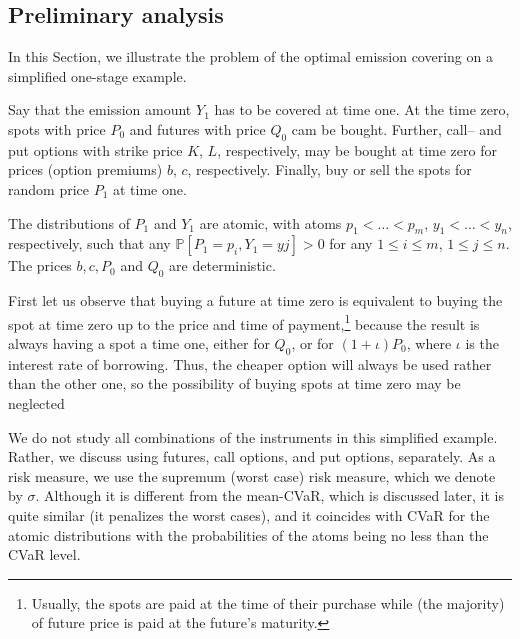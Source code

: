 \documentclass[3p,times]{elsarticle}
\begin{document}
\subsection*{Preliminary analysis}

In this Section, we illustrate the problem of the optimal emission covering on a simplified one-stage example. 

Say that the emission amount $Y_1$ has to be covered at time one. At the time zero, spots with price $P_0$ and futures with price $Q_0$ cam be bought.  Further, call-- and put options with strike price $K$, $L$, respectively, may be bought at time zero for prices (option premiums) $b$, $c$, respectively. Finally, buy or sell the spots for random price $P_1$ at time one.

The distributions of $P_1$ and $Y_1$ are atomic, with atoms $p_1<\dots<p_m$, $y_1< \dots < y_n$, respectively, such that any $\mathbb{P}[P_1=p_i,Y_1=yj] > 0$ for any $1\leq i \leq m$, $1\leq j \leq n$. 
The prices $b,c,P_0$ and $Q_0$ are deterministic.

First let us observe that buying a future at time zero is equivalent to buying the spot at time zero up to the price and time of payment,\footnote{Usually, the spots are paid at the time of their purchase  while (the majority) of future price is paid at the future's maturity.} because the result is always having a spot a time one, either for $Q_0$, or for $(1+\iota) P_0$, where $\iota$ is the interest rate of borrowing. Thus, the cheaper option will always be used rather than the other one, so the possibility of buying spots at time zero may be neglected

We do not study all combinations of the instruments in this simplified example. Rather, we discuss using futures, call options, and put options, separately. As a risk measure, we use the supremum (worst case) risk measure, which we denote by $\sigma$. Although it is different from the mean-CVaR, which is discussed later, it is quite similar (it penalizes the worst cases), and it coincides with CVaR for the atomic distributions with the probabilities of the atoms being no less than the CVaR level. 
\end{document}
